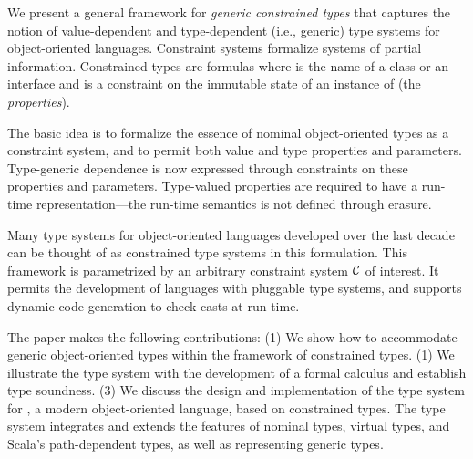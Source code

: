 We present a general framework for \emph{generic constrained types}
that captures the notion of value-dependent and
type-dependent (i.e., generic) type systems for object-oriented
languages.  Constraint systems formalize systems of partial
information.  Constrained types are formulas  where
 is the name of a class or an interface and  is a
constraint on the immutable state of an instance of  (the
{\em properties}).

The basic idea is to formalize the essence of nominal
object-oriented types as a constraint system, and to permit both
value and type properties and parameters.  Type-generic
dependence is now expressed through constraints on these
properties and parameters.  Type-valued properties are required
to have a run-time representation---the run-time semantics is
not defined through erasure.

Many type systems for object-oriented languages developed over
the last decade can be thought of as constrained type systems in
this formulation.  This framework is parametrized by an
arbitrary constraint system $\cal C$ of interest.  It permits
the development of languages with pluggable type systems, and
supports dynamic code generation to check casts at run-time.

The paper makes the following contributions: (1) We show how to
accommodate generic object-oriented types within the framework of
constrained types. (1) We illustrate the type system with the
development of a formal calculus \FX{} and establish type
soundness. (3) We discuss the design and implementation of the
type system for \Xten{}, a modern object-oriented language, based on
constrained types.  The type system integrates and extends the
features of nominal types, virtual types, and
Scala's path-dependent types, as well as representing generic
types.
